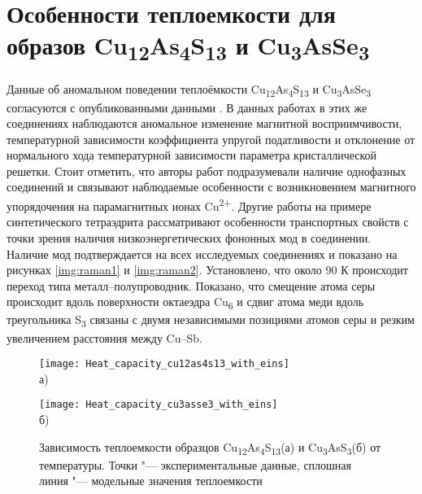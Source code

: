 \clearpage

\newpage

\section{Особенности теплоемкости для образов Cu\textsubscript{12}As\textsubscript{4}S\textsubscript{13} и Cu\textsubscript{3}AsSe\textsubscript{3} } \label{sect3_2}

Данные об аномальном поведении теплоёмкости Cu\textsubscript{12}As\textsubscript{4}S\textsubscript{13} и Cu\textsubscript{3}AsSe\textsubscript{3} согласуются с опубликованными данными \cite{bab_1982,bab_81}. 
В данных работах в этих же соединениях наблюдаются аномальное изменение магнитной восприимчивости, температурной зависимости коэффициента упругой податливости и отклонение от нормального хода температурной зависимости параметра кристаллической решетки. 
Стоит отметить, что авторы работ \cite{bab_1982,bab_81} подразумевали наличие однофазных соединений и связывают наблюдаемые особенности с возникновением магнитного упорядочения на парамагнитных ионах Cu\textsuperscript{2+}. 
Другие работы \cite{Lara-Curzio2014,Nasonova2016} на примере синтетического тетраэдрита рассматривают особенности транспортных свойств  с точки зрения наличия низкоэнергетических фононных мод в соединении. Наличие мод подтверждается на всех исследуемых соединениях и показано на рисунках \ref{img:raman1} и \ref{img:raman2}.
Установлено, что около 90 К происходит переход типа металл--полупроводник. Показано, что смещение атома серы происходит вдоль поверхности октаеэдра Cu\textsubscript{6} и сдвиг атома меди вдоль треугольника S\textsubscript{3} связаны с двумя независимыми позициями атомов серы и резким увеличением расстояния между Cu--Sb. 

\begin{figure}[p!]
  \begin{minipage}[ht]{0.9\linewidth}\centering
    \texttt{[image: Heat\_capacity\_cu12as4s13\_with\_eins]} \\ а)
  \end{minipage}
  \vfill
  \begin{minipage}[ht]{0.9\linewidth}\centering
    \texttt{[image: Heat\_capacity\_cu3asse3\_with\_eins]} \\ б)
  \end{minipage}

      \caption[Зависимость теплоемкости образцов Cu\textsubscript{12}As\textsubscript{4}S\textsubscript{13}(а) и Cu\textsubscript{3}AsS\textsubscript{3}(б) от температуры. Точки "--- экспериментальные данные, сплошная линия "--- модельные значения теплоемкости]{Зависимость теплоемкости образцов Cu\textsubscript{12}As\textsubscript{4}S\textsubscript{13}(а) и Cu\textsubscript{3}AsS\textsubscript{3}(б) от температуры. Точки "--- экспериментальные данные, сплошная линия "--- модельные значения теплоемкости}
    \label{img:heat_en}
\end{figure}


